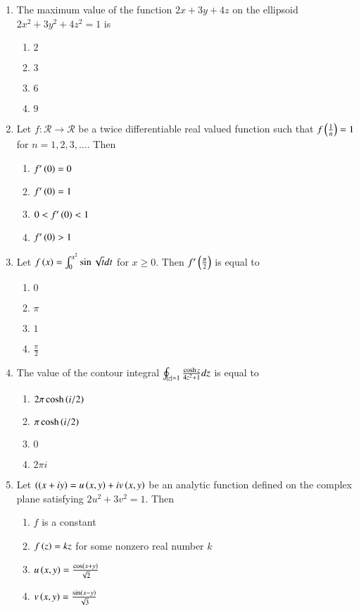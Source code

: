 \documentclass[journal]{IEEEtran}
\begin{document}
\begin{enumerate}
    \item The maximum value of the function $2x +3y +4z$ on the ellipsoid $2x^2 +3y^2+ 4z^2 = 1$ is
        \begin{enumerate}
            \item $2$
            \item $3$
            \item $6$
            \item $9$
        \end{enumerate}

    \item Let $f : \mathcal{R} \to \mathcal{R}$ be a twice differentiable real valued function such that $f\left(\frac{1}{n}\right) = 1$ for $n = 1,2,3,\ldots$. Then
        \begin{enumerate}
            \item $f^{\prime}\left(0\right) = 0$
            \item $f^{\prime}\left(0\right) = 1$
            \item $0 < f^{\prime}\left(0\right) < 1$
            \item $f^{\prime}\left(0\right) > 1$
        \end{enumerate}

    \item Let $f\left(x\right) = \int_{0}^{x^2} \sin \sqrt{t} dt$ for $x\geq0$. Then $f^{\prime}\left(\frac{\pi}{2}\right)$ is equal to
        \begin{enumerate}
            \item $0$
            \item $\pi$
            \item $1$
            \item $\frac{\pi}{2}$
        \end{enumerate}

    \item The value of the contour integral $\oint_{\left\vert z\right\vert=1} \frac{\cosh z}{4z^2+1} dz$ is equal to
        \begin{enumerate}
            \item $2 \pi \cosh \left(i/2\right)$
            \item $\pi \cosh \left(i/2\right)$
            \item $0$
            \item $2 \pi i$
        \end{enumerate}

    \item Let $\left((x + iy\right) = u\left(x,y\right) + iv\left(x,y\right)$ be an analytic function defined on the complex plane satisfying $2u^2 + 3v^2=1$. Then
        \begin{enumerate}
            \item $f$ is a constant
            \item $f\left(z\right) = kz$ for some nonzero real number $k$
            \item $u\left(x,y\right) = \frac{\cos \left(x+y\right)}{\sqrt{2}}$
            \item $v\left(x,y\right) = \frac{\sin \left(x-y\right)}{\sqrt{3}}$
        \end{enumerate}


\end{enumerate}
\end{document}
